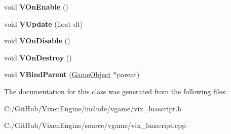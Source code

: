 \begin{DoxyCompactItemize}
\item 
\hypertarget{class_vixen_1_1_lua_script_a564be071abd4985ae623fea1c443f041}{}void {\bfseries V\+On\+Enable} ()\label{class_vixen_1_1_lua_script_a564be071abd4985ae623fea1c443f041}

\item 
\hypertarget{class_vixen_1_1_lua_script_a87d213aa240fb5a728ffad557dfb3f2b}{}void {\bfseries V\+Update} (float dt)\label{class_vixen_1_1_lua_script_a87d213aa240fb5a728ffad557dfb3f2b}

\item 
\hypertarget{class_vixen_1_1_lua_script_a0d59868b67c5fcb39d275a6da09f263b}{}void {\bfseries V\+On\+Disable} ()\label{class_vixen_1_1_lua_script_a0d59868b67c5fcb39d275a6da09f263b}

\item 
\hypertarget{class_vixen_1_1_lua_script_aade180a87ca7b64d5915726cd84a87cd}{}void {\bfseries V\+On\+Destroy} ()\label{class_vixen_1_1_lua_script_aade180a87ca7b64d5915726cd84a87cd}

\item 
\hypertarget{class_vixen_1_1_lua_script_a4e13a3e383c99494d88e621ae2f99cea}{}void {\bfseries V\+Bind\+Parent} (\hyperlink{class_vixen_1_1_game_object}{Game\+Object} $\ast$parent)\label{class_vixen_1_1_lua_script_a4e13a3e383c99494d88e621ae2f99cea}

\end{DoxyCompactItemize}


The documentation for this class was generated from the following files\+:\begin{DoxyCompactItemize}
\item 
C\+:/\+Git\+Hub/\+Vixen\+Engine/include/vgame/vix\+\_\+luascript.\+h\item 
C\+:/\+Git\+Hub/\+Vixen\+Engine/source/vgame/vix\+\_\+luascript.\+cpp\end{DoxyCompactItemize}
